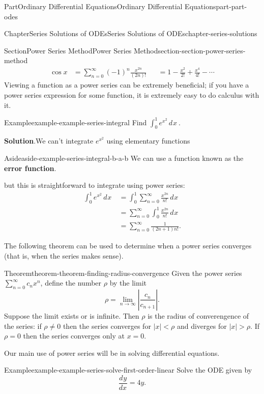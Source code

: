 \documentclass[twoside,10pt,]{book}
\newcommand{\blocktitlefont}{\relax}
\newcommand{\terminology}[1]{\textbf{#1}}
\numberwithin{equation}{part}
\newcommand{\limit}[2]{\lim_{#1\to#2}}
\newcommand{\dv}[3][]{\dfrac{d^{#1} #2}{d #3^{#1}}}
\newcommand{\dd}[2][]{\, d^{#1} #2\ }
\newcommand{\lt}{<}
\newcommand{\gt}{>}
\begin{document}
\begin{partptx}{Part}{Ordinary Differential Equations}{}{Ordinary Differential Equations}{}{}{part-part-odes}
\begin{chapterptx}{Chapter}{Series Solutions of ODEs}{}{Series Solutions of ODEs}{}{}{chapter-series-solutions}
\begin{sectionptx}{Section}{Power Series Method}{}{Power Series Method}{}{}{section-section-power-series-method}
\begin{align*}
\cos x &= \sum_{n=0}^{\infty}(-1)^{n}\frac{x^{2n}}{(2n)!} & &= 1 - \frac{x^{2}}{2!} + \frac{x^{4}}{4!} - \cdots
\end{align*}
Viewing a function as a power series can be extremely beneficial; if you have a power series expression for some function, it is extremely easy to do calculus with it.%
\begin{example}{Example}{}{example-example-series-integral}%
Find \(\displaystyle\int_{0}^{1}e^{x^{2}}\dd{x}\).%
\par\smallskip%
\noindent\textbf{\blocktitlefont Solution}.\hypertarget{solution-example-series-integral-b}{}\quad{}We can't integrate \(e^{x^{2}}\) using elementary functions \begin{aside}{Aside}{}{aside-example-series-integral-b-a-b}%
We can use a function known as the \terminology{error function}.%
\end{aside}
 but this is straightforward to integrate using power series:%
\begin{align*}
\int_{0}^{1}e^{x^{2}}\dd{x} &= \int_{0}^{1}\sum_{n=0}^{\infty}\frac{x^{2n}}{n!}\dd{x}\\
&= \sum_{n=0}^{\infty}\int_{0}^{1}\frac{x^{2n}}{n!}\dd{x}\\
&= \sum_{n=0}^{\infty}\frac{1}{(2n+1)n!}\text{.}
\end{align*}
%
\end{example}
The following theorem can be used to determine when a power series converges (that is, when the series makes sense).%
\begin{theorem}{Theorem}{}{}{theorem-theorem-finding-radius-convergence}%
Given the power series \(\sum_{n=0}^{\infty}c_{n}x^{n}\), define the number \(\rho\) by the limit%
\begin{equation*}
\rho = \limit{n}{\infty}\left|\frac{c_{n}}{c_{n+1}}\right|.
\end{equation*}
Suppose the limit exists or is infinite. Then \(\rho\) is the radius of converengence of the series: if \(\rho\neq0\) then the series converges for \(|x|\lt\rho\) and diverges for \(|x|\gt\rho\). If \(\rho=0\) then the series converges only at \(x=0\).%
\end{theorem}
Our main use of power series will be in solving differential equations.%
\begin{example}{Example}{}{example-example-series-solve-first-order-linear}%
Solve the ODE given by%
\begin{equation*}
\dv{y}{x} = 4y.
\end{equation*}
%
\par\smallskip%

\end{example}
\end{sectionptx}
\end{chapterptx}
\end{partptx}
\end{document}
